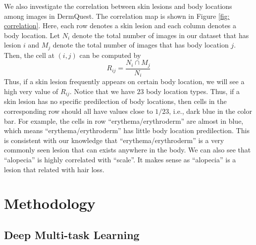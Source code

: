 \documentclass[letterpaper]{article}
\begin{document}
We also investigate the correlation between skin lesions and body locations
among images in DermQuest. The correlation map is shown in Figure \ref{fig: correlation}.
Here, each row denotes a skin lesion and each column denotes a body location.
Let $N_i$ denote the total number of images in our dataset that has lesion $i$
and $M_j$ denote the total number of images that has body location $j$. Then, the
cell at $(i, j)$ can be computed by
\begin{equation}
R_{ij} = \frac{N_i \cap M_j}{N_i}
\end{equation}
Thus, if a skin lesion frequently appears on certain body location, we will see
a high very value of $R_{ij}$. Notice that we have $23$ body location types. Thus,
if a skin lesion has no specific predilection of body locations, then cells in
the corresponding row should all have values close to $1/23$, i.e., dark blue in
the color bar. For example, the cells in row ``erythema/erythroderm'' are almost
in blue, which means ``erythema/erythroderm'' has little body location predilection.
This is consistent with our knowledge that ``erythema/erythroderm'' is a very
commonly seen lesion that can exists anywhere in the body. We can also see that
``alopecia'' is highly correlated with ``scale''. It makes sense as ``alopecia''
is a lesion that related with hair loss.

\section{Methodology}

\subsection{Deep Multi-task Learning}
\end{document}
